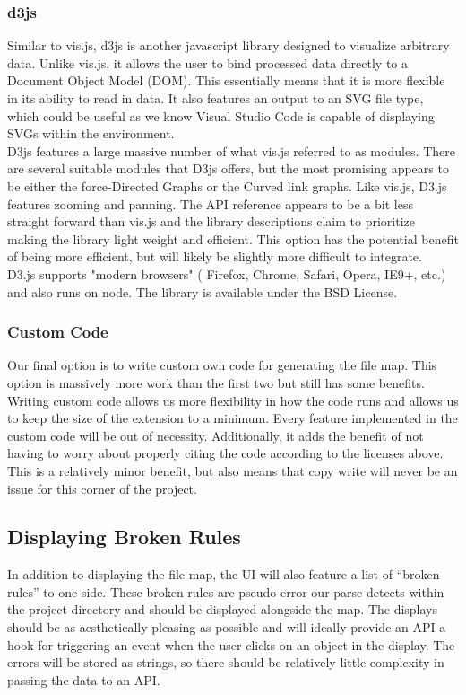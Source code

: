 \documentclass[letterpaper,10pt,titlepage,draftclsnofoot,onecolumn,onesided] {IEEEtran}
\begin{document}
\subsubsection{d3js}
Similar to vis.js, d3js is another javascript library designed to visualize arbitrary data. 
Unlike vis.js, it allows the user to bind processed data directly to a Document Object Model (DOM). 
This essentially means that it is more flexible in its ability to read in data. 
It also features an output to an SVG file type, which could be useful as we know Visual Studio Code is capable of displaying SVGs within the environment. 
\\
D3js features a large massive number of what vis.js referred to as modules. 
There are several suitable modules that D3js offers, but the most promising appears to be either the force-Directed Graphs or the Curved link graphs. 
Like vis.js, D3.js features zooming and panning. 
The API reference appears to be a bit less straight forward than vis.js and the library descriptions claim to prioritize making the library light weight and efficient. 
This option has the potential benefit of being more efficient, but will likely be slightly more difficult to integrate.
\\
D3.js supports "modern browsers" ( Firefox, Chrome, Safari, Opera, IE9+, etc.) and also runs on node. 
The library is available under the BSD License.


\subsubsection{Custom Code}
Our final option is to write custom own code for generating the file map. 
This option is massively more work than the first two but still has some benefits. 
Writing custom code allows us more flexibility in how the code runs and allows us to keep the size of the extension to a minimum. 
Every feature implemented in the custom code will be out of necessity. 
Additionally, it adds the benefit of not having to worry about properly citing the code according to the licenses above. 
This is a relatively minor benefit, but also means that copy write will never be an issue for this corner of the project.

\subsection{Displaying Broken Rules}
In addition to displaying the file map, the UI will also feature a list of “broken rules” to one side. 
These broken rules are pseudo-error our parse detects within the project directory and should be displayed alongside the map. 
The displays should be as aesthetically pleasing as possible and will ideally provide an API a hook for triggering an event when the user clicks on an object in the display. 
The errors will be stored as strings, so there should be relatively little complexity in passing the data to an API. \\
\end{document}
